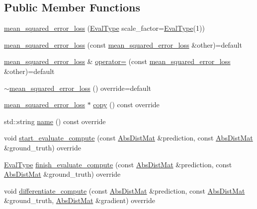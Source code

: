 \subsection*{Public Member Functions}
\begin{DoxyCompactItemize}
\item 
\hyperlink{classlbann_1_1mean__squared__error__loss_a97883c4e1491dcf28f21179b62090c48}{mean\+\_\+squared\+\_\+error\+\_\+loss} (\hyperlink{base_8hpp_a3266f5ac18504bbadea983c109566867}{Eval\+Type} scale\+\_\+factor=\hyperlink{base_8hpp_a3266f5ac18504bbadea983c109566867}{Eval\+Type}(1))
\item 
\hyperlink{classlbann_1_1mean__squared__error__loss_a142976fada7414ea93a1f7fd873624e3}{mean\+\_\+squared\+\_\+error\+\_\+loss} (const \hyperlink{classlbann_1_1mean__squared__error__loss}{mean\+\_\+squared\+\_\+error\+\_\+loss} \&other)=default
\item 
\hyperlink{classlbann_1_1mean__squared__error__loss}{mean\+\_\+squared\+\_\+error\+\_\+loss} \& \hyperlink{classlbann_1_1mean__squared__error__loss_a7b992996646a230f132a4df1608f1973}{operator=} (const \hyperlink{classlbann_1_1mean__squared__error__loss}{mean\+\_\+squared\+\_\+error\+\_\+loss} \&other)=default
\item 
\hyperlink{classlbann_1_1mean__squared__error__loss_a9c22711f4def47a20a2c4234e32881a0}{$\sim$mean\+\_\+squared\+\_\+error\+\_\+loss} () override=default
\item 
\hyperlink{classlbann_1_1mean__squared__error__loss}{mean\+\_\+squared\+\_\+error\+\_\+loss} $\ast$ \hyperlink{classlbann_1_1mean__squared__error__loss_aac723abb01bb19090018b3bddc9b49b0}{copy} () const override
\item 
std\+::string \hyperlink{classlbann_1_1mean__squared__error__loss_ab34d59b168205f198b1d4c299365fbbb}{name} () const override
\item 
void \hyperlink{classlbann_1_1mean__squared__error__loss_a5cfc9b54a4161015f63e5445e34f49f4}{start\+\_\+evaluate\+\_\+compute} (const \hyperlink{base_8hpp_a9a697a504ae84010e7439ffec862b470}{Abs\+Dist\+Mat} \&prediction, const \hyperlink{base_8hpp_a9a697a504ae84010e7439ffec862b470}{Abs\+Dist\+Mat} \&ground\+\_\+truth) override
\item 
\hyperlink{base_8hpp_a3266f5ac18504bbadea983c109566867}{Eval\+Type} \hyperlink{classlbann_1_1mean__squared__error__loss_a5486b4e6d6b6fbfdd6fdd381f7cbd7eb}{finish\+\_\+evaluate\+\_\+compute} (const \hyperlink{base_8hpp_a9a697a504ae84010e7439ffec862b470}{Abs\+Dist\+Mat} \&prediction, const \hyperlink{base_8hpp_a9a697a504ae84010e7439ffec862b470}{Abs\+Dist\+Mat} \&ground\+\_\+truth) override
\item 
void \hyperlink{classlbann_1_1mean__squared__error__loss_aef698469d2e70a5d42e402eeca50efa3}{differentiate\+\_\+compute} (const \hyperlink{base_8hpp_a9a697a504ae84010e7439ffec862b470}{Abs\+Dist\+Mat} \&prediction, const \hyperlink{base_8hpp_a9a697a504ae84010e7439ffec862b470}{Abs\+Dist\+Mat} \&ground\+\_\+truth, \hyperlink{base_8hpp_a9a697a504ae84010e7439ffec862b470}{Abs\+Dist\+Mat} \&gradient) override
\end{DoxyCompactItemize}
